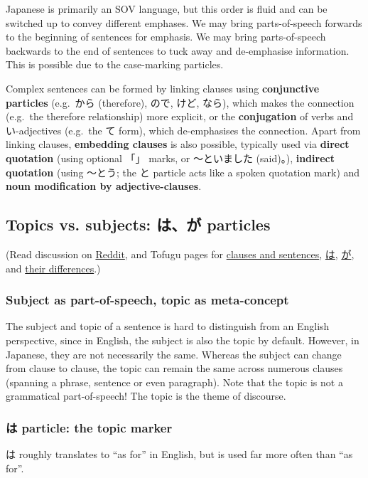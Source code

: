 \documentclass[../nihongo-gakushuu-kyouzai.tex]{subfiles}
\begin{document}
Japanese is primarily an SOV language, but this order is fluid and can be switched up to convey different emphases. We may bring parts-of-speech forwards to the beginning of sentences for emphasis. We may bring parts-of-speech backwards to the end of sentences to tuck away and de-emphasise information. This is possible due to the case-marking particles.

Complex sentences can be formed by linking clauses using \textbf{conjunctive particles} (e.g.\ から (therefore), ので, けど, なら), which makes the connection (e.g.\ the therefore relationship) more explicit, or the \textbf{conjugation} of verbs and い-adjectives (e.g.\ the て form), which de-emphasises the connection. Apart from linking clauses, \textbf{embedding clauses} is also possible, typically used via \textbf{direct quotation} (using optional 「」 marks, or 〜といました (said)。), \textbf{indirect quotation} (using 〜とう; the と particle acts like a spoken quotation mark) and \textbf{noun modification by adjective-clauses}.

\subsection{Topics vs. subjects: は、が particles} \label{sec:topics-and-subjects}
(Read discussion on \href{https://www.reddit.com/r/LearnJapanese/comments/jt49jj/please_stop_thinking_in_terms_of_\%E3\%81\%AF_vs_\%E3\%81\%8C/}{Reddit}, and Tofugu pages for \href{https://www.tofugu.com/japanese-grammar/sentences-and-clauses/}{clauses and sentences}, \href{https://www.tofugu.com/japanese-grammar/particle-wa/}{は}, \href{https://www.tofugu.com/japanese-grammar/particle-ga/}{が}, and \href{https://www.tofugu.com/japanese/wa-and-ga/}{their differences}.)

\subsubsection{Subject as part-of-speech, topic as meta-concept}
The subject and topic of a sentence is hard to distinguish from an English perspective, since in English, the subject is also the topic by default. However, in Japanese, they are not necessarily the same. Whereas the subject can change from clause to clause, the topic can remain the same across numerous clauses (spanning a phrase, sentence or even paragraph). Note that the topic is not a grammatical part-of-speech! The topic is the theme of discourse.

\subsubsection{は particle: the topic marker} \label{sec:topic-marker}
は roughly translates to ``as for'' in English, but is used far more often than ``as for''.
\end{document}
